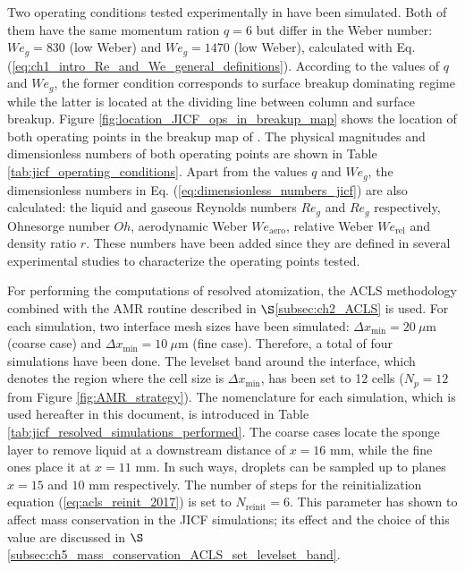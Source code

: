 Two operating conditions tested experimentally in  have been simulated. Both of them have the same momentum ration $q = 6$ but differ in the Weber number: $We_g = 830$ (low Weber) and $We_g = 1470$ (low Weber), calculated with Eq. (\ref{eq:ch1_intro_Re_and_We_general_definitions}). According to the values of $q$ and $We_g$, the former condition corresponds to surface breakup dominating regime while the latter is located at the dividing line between column and surface breakup. Figure \ref{fig:location_JICF_ops_in_breakup_map} shows the location of both operating points in the breakup map of \citeColor[wu_breakup_1997]. The physical magnitudes and dimensionless numbers of both operating points are shown in Table \ref{tab:jicf_operating_conditions}. Apart from the values $q$ and $We_g$, the dimensionless numbers in  Eq. (\ref{eq:dimensionless_numbers_jicf}) are also calculated: the liquid and gaseous Reynolds numbers $Re_g$ and $Re_g$ respectively, Ohnesorge number $Oh$, aerodynamic Weber $We_\mathrm{aero}$, relative Weber $We_\mathrm{rel}$ and density ratio $r$. These numbers have been added since they are defined in several experimental studies  to characterize the operating points tested. 

For performing the computations of resolved atomization, the ACLS methodology combined with the AMR routine described in $\S$\ref{subsec:ch2_ACLS} is used. For each simulation, two interface mesh sizes have been simulated: $\Delta x_\mathrm{min} = 20 ~\mu$m (coarse case) and $\Delta x_\mathrm{min} = 10 ~\mu$m (fine case). Therefore, a total of four simulations have been done. The levelset band around the interface, which denotes the region where the cell size is $\Delta x_\mathrm{min}$, has been set to 12 cells ($N_p = 12$ from Figure \ref{fig:AMR_strategy}). The nomenclature for each simulation, which is used hereafter in this document, is introduced in Table \ref{tab:jicf_resolved_simulations_performed}.  The coarse cases locate the sponge layer to remove liquid at a downstream distance of $x = 16$ mm, while the fine ones place it at $x = 11$ mm. In such ways, droplets can be sampled up to planes $x = 15$ and $10$ mm respectively. The number of steps for the reinitialization equation (\ref{eq:acls_reinit_2017}) is set to $N_\mathrm{reinit} = 6$. This parameter has shown to affect mass conservation in the JICF simulations; its effect and the choice of this value are discussed in $\S$\ref{subsec:ch5_mass_conservation_ACLS_set_levelset_band}.

